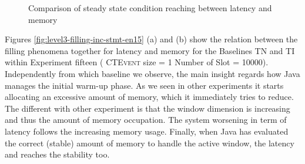 \begin{figure}[tbh]
  \centering
  	\label{fig:level3-steady-naive-graph-en7-12}  	
  	\caption{Comparison of steady state condition reaching between latency and memory} 
\end{figure}

Figures \ref{fig:level3-filling-inc-stmt-en15} (a) and (b) show the relation between the filling phenomena together for latency and memory for the Baselines TN and TI within Experiment fifteen ( \textsc{CTEvent} size = 1 Number of Slot = 10000). Independently from which baseline we observe, the main insight regards how Java manages the initial warm-up phase. As we seen in other experiments it starts allocating an excessive amount of memory, which it immediately tries to reduce. The different with other experiment is that the window dimension is increasing and thus the amount of memory occupation. The system worsening in term of latency follows the increasing memory usage. Finally, when Java has evaluated the correct (stable) amount of memory to handle the active window, the latency and reaches the stability too.

